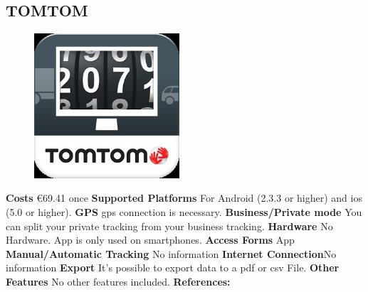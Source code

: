 \begin{singlespace}
\section{TOMTOM}
\begin{figure}
  \begin{center}
    \includegraphics[width=0.48\textwidth]{bilder/tomtom}
  \end{center}
\end{figure}
\textbf{Costs} \euro 69.41 once\newline\newline
\textbf{Supported Platforms} For Android (2.3.3 or higher) and \gls{ios} (5.0 or higher).\newline\newline
\textbf{GPS} \gls{gps} connection is necessary.\newline\newline
\textbf{Business/Private mode} You can split your private tracking from your business tracking.\newline\newline
\textbf{Hardware} No Hardware. App is only used on smartphones.\newline\newline
\textbf{Access Forms} App\newline\newline
\textbf{Manual/Automatic Tracking} No information\newline\newline
\textbf{Internet Connection}No information
\textbf{Export} It’s possible to export data to a \gls{pdf} or \gls{csv} File.\newline\newline
\textbf{Other Features} No other features included.\newline\newline
\textbf{References:} \cite{Electronic_Logbook_from_TOMTOM}\newline\newline
\newpage


\end{singlespace}
